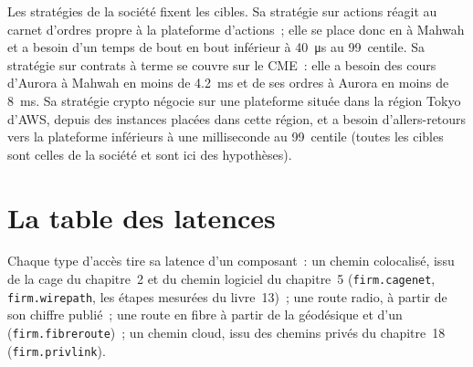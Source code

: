 Les stratégies de la société fixent les cibles. Sa stratégie sur actions réagit au carnet d'ordres propre à la plateforme d'actions~; elle se place donc en  à Mahwah et
a besoin d'un temps de bout en bout inférieur à \qty{40}{\micro\second} au 99~centile. Sa stratégie sur contrats à terme se couvre sur le CME~: elle a besoin des cours d'Aurora
à Mahwah en moins de \qty{4.2}{\milli\second} et de ses ordres à Aurora en moins de \qty{8}{\milli\second}. Sa stratégie crypto négocie sur une
plateforme située dans la région Tokyo d'AWS, depuis des instances placées dans cette région, et a besoin d'allers-retours vers la plateforme inférieurs à une milliseconde au 99~centile
(toutes les cibles sont celles de la société et sont ici des hypothèses).

\label{lst:nw:build-a-connectivity-plan:plan}

\section{La table des latences}

Chaque type d'accès tire sa latence d'un composant~: un chemin colocalisé, issu de la cage du chapitre~2 et du chemin logiciel du chapitre~5
(\texttt{firm.cagenet}, \texttt{firm.wirepath}, les étapes mesurées du livre~13)~; une route radio, à partir de son chiffre publié~; une route en fibre
à partir de la géodésique et d'un  (\texttt{firm.fibreroute})~; un chemin cloud, issu des chemins privés du chapitre~18
(\texttt{firm.privlink}).

\label{lst:nw:build-a-connectivity-plan:latency}


